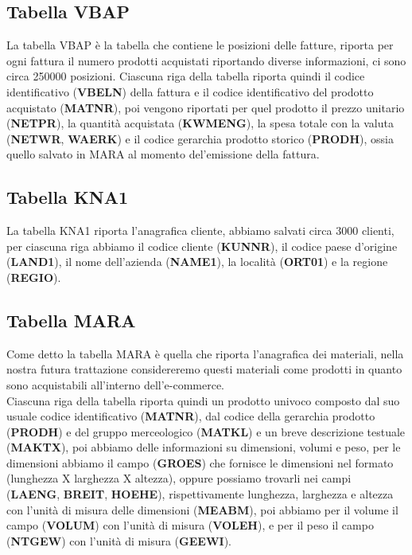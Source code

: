 \subsection{Tabella VBAP}
La tabella VBAP è la tabella che contiene le posizioni delle fatture, riporta per ogni fattura il numero prodotti acquistati riportando diverse informazioni, ci sono circa 250000 posizioni.
Ciascuna riga della tabella riporta quindi il codice identificativo (\textbf{VBELN}) della fattura e il codice identificativo del prodotto acquistato (\textbf{MATNR}), poi vengono riportati per quel prodotto il prezzo unitario (\textbf{NETPR}), la quantità acquistata (\textbf{KWMENG}), la spesa totale con la valuta (\textbf{NETWR}, \textbf{WAERK}) e il codice gerarchia prodotto storico (\textbf{PRODH}), ossia quello salvato in MARA al momento del'emissione della fattura.

\subsection{Tabella KNA1}
La tabella KNA1 riporta l'anagrafica cliente, abbiamo salvati circa 3000 clienti, per ciascuna riga abbiamo il codice cliente (\textbf{KUNNR}), il codice paese d'origine (\textbf{LAND1}), il nome dell'azienda (\textbf{NAME1}), la località (\textbf{ORT01}) e la regione (\textbf{REGIO}).

\subsection{Tabella MARA}
Come detto la tabella MARA è quella che riporta l'anagrafica dei materiali, nella nostra futura trattazione considereremo questi materiali come prodotti in quanto sono acquistabili all'interno dell'e-commerce.\\
Ciascuna riga della tabella riporta quindi un prodotto univoco composto dal suo usuale codice identificativo (\textbf{MATNR}), dal codice della gerarchia prodotto (\textbf{PRODH}) e del gruppo merceologico (\textbf{MATKL}) e un breve descrizione testuale (\textbf{MAKTX}), poi abbiamo delle informazioni su dimensioni, volumi e peso, per le dimensioni abbiamo il campo (\textbf{GROES}) che fornisce le dimensioni nel formato (lunghezza X larghezza X altezza), oppure possiamo trovarli nei campi (\textbf{LAENG}, \textbf{BREIT}, \textbf{HOEHE}), rispettivamente lunghezza, larghezza e altezza con l'unità di misura delle dimensioni (\textbf{MEABM}), poi abbiamo per il volume il campo (\textbf{VOLUM}) con l'unità di misura (\textbf{VOLEH}), e per il peso il campo (\textbf{NTGEW}) con l'unità di misura (\textbf{GEEWI}).

